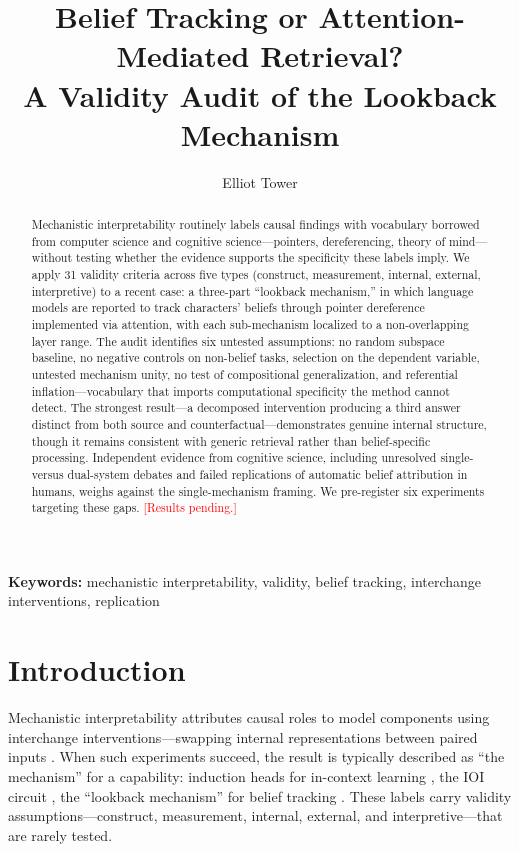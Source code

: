 \documentclass[11pt]{article}
\title{Belief Tracking or Attention-Mediated Retrieval?\\A Validity Audit of the Lookback Mechanism}
\author{Elliot Tower}
\affil{Independent Researcher \\ \texttt{elliot@elliottower.ai}}
\begin{document}
\linenumbers
\maketitle

\begin{abstract}
Mechanistic interpretability routinely labels causal findings with vocabulary borrowed from computer science and cognitive science---pointers, dereferencing, theory of mind---without testing whether the evidence supports the specificity these labels imply. We apply 31 validity criteria across five types (construct, measurement, internal, external, interpretive) to a recent case: a three-part ``lookback mechanism,'' in which language models are reported to track characters' beliefs through pointer dereference implemented via attention, with each sub-mechanism localized to a non-overlapping layer range. The audit identifies six untested assumptions: no random subspace baseline, no negative controls on non-belief tasks, selection on the dependent variable, untested mechanism unity, no test of compositional generalization, and referential inflation---vocabulary that imports computational specificity the method cannot detect. The strongest result---a decomposed intervention producing a third answer distinct from both source and counterfactual---demonstrates genuine internal structure, though it remains consistent with generic retrieval rather than belief-specific processing. Independent evidence from cognitive science, including unresolved single- versus dual-system debates and failed replications of automatic belief attribution in humans, weighs against the single-mechanism framing. We pre-register six experiments targeting these gaps. \textcolor{red}{[Results pending.]}
\end{abstract}

\noindent\textbf{Keywords:} mechanistic interpretability, validity, belief tracking, interchange interventions, replication


\section{Introduction}
\label{sec:intro}

Mechanistic interpretability attributes causal roles to model components using interchange interventions---swapping internal representations between paired inputs \citep{geiger2021causal, vig2020investigating}. When such experiments succeed, the result is typically described as ``the mechanism'' for a capability: induction heads for in-context learning \citep{olsson2022context}, the IOI circuit \citep{wang2023interpretability}, the ``lookback mechanism'' for belief tracking \citep{prakash2025lookback}. These labels carry validity assumptions---construct, measurement, internal, external, and interpretive---that are rarely tested.
\end{document}
